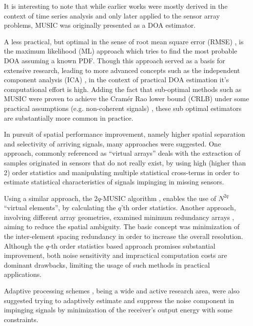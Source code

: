 It is interesting to note that while earlier works were mostly derived in the context of time series analysis and only later applied to the sensor array problems, MUSIC was originally presented as a DOA estimator.
\par A less practical, but optimal in the sense of root mean square error (RMSE) \cite{krim1996two}, is the maximum likelihood (ML) approach which tries to find the most probable DOA assuming a known PDF.
Though this approach served as a basis for extensive research, leading to more advanced concepts such as the independent component analysis (ICA) \cite{hyvarinen1999survey}, in the context of practical DOA estimation it's computational effort is high.
Adding the fact that sub-optimal methods such as MUSIC were proven to achieve the Cram\'er Rao lower bound (CRLB) under some practical assumptions (e.g. non-coherent signals) \cite{stoica1989music}, these sub optimal estimators are substantially more common in practice. 
\par In pursuit of spatial performance improvement, namely higher spatial separation and selectivity of arriving signals, many approaches were suggested.  
One approach, commonly referenced as ``virtual arrays'' \cite{pal2010nested,chevalier2005virtual,dogan1995applications} deals with the extraction of samples originated in sensors that do not really exist, by using high (higher than 2) order statistics and manipulating multiple statistical cross-terms in order to estimate statistical characteristics of signals impinging in missing sensors.
\par Using a similar approach, the $2q$-MUSIC algorithm \cite{chevalier2006high}, enables the use of $N^{2q}$ ``virtual elements'', by calculating the $q$'th order statistics.
Another approach, involving different array geometries, examined minimum redundancy arrays \cite{moffet1968minimum,pillai1985new,pillai1987statistical,Kupershtein2013}, aiming to reduce the spatial ambiguity. The basic concept was minimization of the inter-element spacing redundancy in order to increase the overall resolution.
Although the $q$-th order statistics based approach promises substantial improvement, both noise sensitivity and impractical computation costs are dominant drawbacks, limiting the usage of such methods in practical applications.   
\par Adaptive processing schemes \cite{frost1972algorithm,manolakis2000statistical}, being a wide and active research area, were also suggested trying to adaptively estimate and suppress the noise component in impinging signals by minimization of the receiver's output energy with some constraints.
